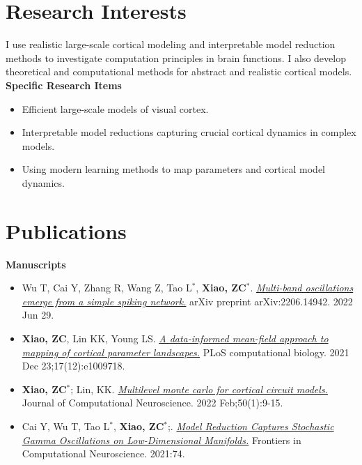 \documentclass[margin, 11pt]{res} %
\begin{document}
\begin{resume}
\section{Research Interests}
I use realistic large-scale cortical modeling and interpretable model reduction methods to investigate computation principles in brain functions. I also develop theoretical and computational methods for abstract and realistic cortical models.\\
{\bf Specific Research Items}
\begin{itemize}
    \item Efficient large-scale models of visual cortex.
    \item Interpretable model reductions capturing crucial cortical dynamics in complex models.
    \item Using modern learning methods to map parameters and cortical model dynamics.
\end{itemize}

\section{Publications}
\label{Publications1}
{\bf Manuscripts}
\begin{itemize}
\item Wu T, Cai Y, Zhang R, Wang Z, Tao L$^*$, \textbf{Xiao, ZC$^*$}. \href{
https://doi.org/10.48550/arXiv.2206.14942}{\textit{Multi-band oscillations emerge from a simple spiking network.}} arXiv preprint arXiv:2206.14942. 2022 Jun 29.

\item \textbf{Xiao, ZC}, Lin KK, Young LS. \href{https://doi.org/10.1371/journal.pcbi.1009718}{\textit{A data-informed mean-field approach to mapping of cortical parameter landscapes.}} PLoS computational biology. 2021 Dec 23;17(12):e1009718.

\item \textbf{Xiao, ZC$^*$}; Lin, KK. \href{https://doi.org/10.1007/s10827-021-00807-3}{\textit{Multilevel monte carlo for cortical circuit models.}}  Journal of Computational Neuroscience. 2022 Feb;50(1):9-15.

\item Cai Y, Wu T, Tao L$^*$, \textbf{Xiao, ZC$^*$};. \href{https://doi.org/10.3389/fncom.2021.678688}{\textit{Model Reduction Captures Stochastic Gamma Oscillations on Low-Dimensional Manifolds.}} Frontiers in Computational Neuroscience. 2021:74.


\end{itemize}
\end{resume}
\end{document}
